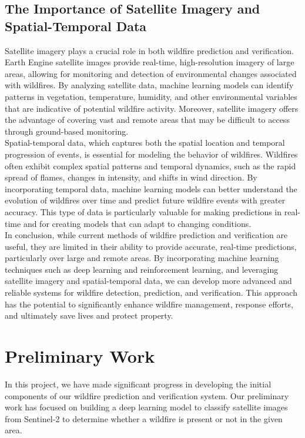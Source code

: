 \documentclass[conference]{IEEEtran}
\begin{document}
\subsection{The Importance of Satellite Imagery and Spatial-Temporal Data}
Satellite imagery plays a crucial role in both wildfire prediction and verification. Earth Engine satellite images provide real-time, high-resolution imagery of large areas, allowing for monitoring and detection of environmental changes associated with wildfires. By analyzing satellite data, machine learning models can identify patterns in vegetation, temperature, humidity, and other environmental variables that are indicative of potential wildfire activity. Moreover, satellite imagery offers the advantage of covering vast and remote areas that may be difficult to access through ground-based monitoring.\\

\noindent
Spatial-temporal data, which captures both the spatial location and temporal progression of events, is essential for modeling the behavior of wildfires. Wildfires often exhibit complex spatial patterns and temporal dynamics, such as the rapid spread of flames, changes in intensity, and shifts in wind direction. By incorporating temporal data, machine learning models can better understand the evolution of wildfires over time and predict future wildfire events with greater accuracy. This type of data is particularly valuable for making predictions in real-time and for creating models that can adapt to changing conditions.\\

\noindent
In conclusion, while current methods of wildfire prediction and verification are useful, they are limited in their ability to provide accurate, real-time predictions, particularly over large and remote areas. By incorporating machine learning techniques such as deep learning and reinforcement learning, and leveraging satellite imagery and spatial-temporal data, we can develop more advanced and reliable systems for wildfire detection, prediction, and verification. This approach has the potential to significantly enhance wildfire management, response efforts, and ultimately save lives and protect property.\\

\section{Preliminary Work}

In this project, we have made significant progress in developing the initial components of our wildfire prediction and verification system. Our preliminary work has focused on building a deep learning model to classify satellite images from Sentinel-2 to determine whether a wildfire is present or not in the given area.\\
\end{document}
